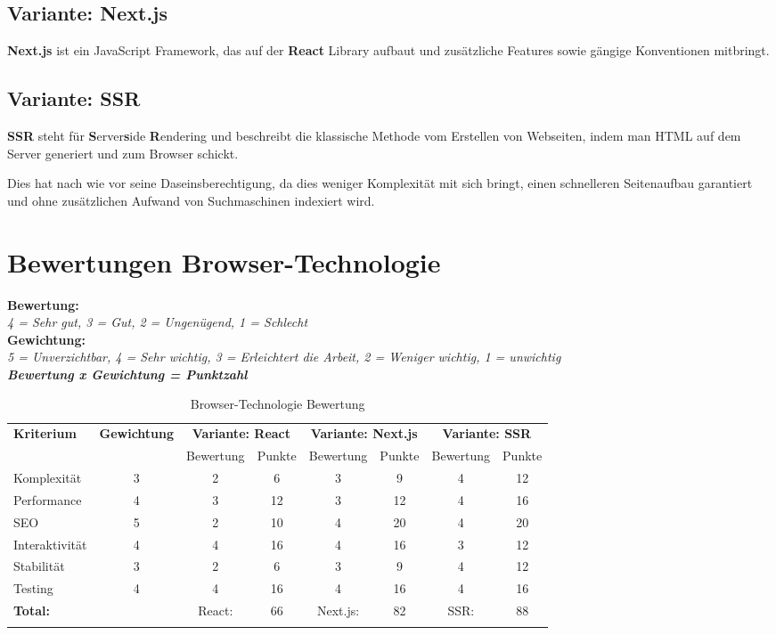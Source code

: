 \subsection{Variante: Next.js}

\textbf{Next.js} ist ein JavaScript Framework, das auf der \textbf{React}
Library aufbaut und zusätzliche Features sowie gängige Konventionen mitbringt.

\subsection{Variante: SSR}

\textbf{SSR} steht für \textbf{S}erver\textbf{s}ide \textbf{R}endering und
beschreibt die klassische Methode vom Erstellen von Webseiten, indem man HTML
auf dem Server generiert und zum Browser schickt.

Dies hat nach wie vor seine Daseinsberechtigung, da dies weniger Komplexität
mit sich bringt, einen schnelleren Seitenaufbau garantiert und ohne
zusätzlichen Aufwand von Suchmaschinen indexiert wird.

\clearpage
\section{Bewertungen Browser-Technologie}\label{bewertungen-browser-technologie}

\textbf{Bewertung:}\\
\textit{4 = Sehr gut, 3 = Gut, 2 = Ungenügend, 1 = Schlecht}\\
\textbf{Gewichtung:}\\
\textit{5 = Unverzichtbar, 4 = Sehr wichtig, 3 = Erleichtert die Arbeit, 2 = Weniger wichtig, 1 = unwichtig}\\

\textbf{\textit{Bewertung x Gewichtung = Punktzahl}}

\begin{longtable}[]{@{}p{2cm}ccccccc@{}}
  \toprule
  \textbf{Kriterium} & \textbf{Gewichtung} & \multicolumn{2}{c}{\textbf{Variante: React}} & \multicolumn{2}{c}{\textbf{Variante: Next.js}} & \multicolumn{2}{c}{\textbf{Variante: SSR}}\tabularnewline
  & & Bewertung & Punkte & Bewertung & Punkte & Bewertung & Punkte \tabularnewline
  \midrule
  \endhead
  Komplexität & 3 & 2 & 6 & 3 & 9 & 4 & 12 \tabularnewline
  Performance & 4 & 3 & 12 & 3 & 12 & 4 & 16 \tabularnewline
  SEO & 5 & 2 & 10 & 4 & 20 & 4 & 20 \tabularnewline
  Interaktivität & 4 & 4 & 16 & 4 & 16 & 3 & 12 \tabularnewline
  Stabilität & 3 & 2 & 6 & 3 & 9 & 4 & 12 \tabularnewline
  Testing & 4 & 4 & 16 & 4 & 16 & 4 & 16 \tabularnewline
  \midrule
  \textbf{Total:} & & React: & 66 & Next.js: & 82 & SSR: & 88 \tabularnewline
  \bottomrule
  \caption{Browser-Technologie Bewertung}
\end{longtable}

